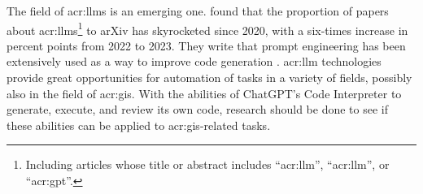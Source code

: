 The field of \glspl{acr:llm} is an emerging one. \cite[2]{fanLargeLanguageModels2023} found that the proportion of papers about \glspl{acr:llm}\footnote{Including articles whose title or abstract includes \enquote{\acrshort{acr:llm}}, \enquote{\acrlong{acr:llm}}, or \enquote{\acrshort{acr:gpt}}.} to arXiv has skyrocketed since 2020, with a six-times increase in percent points from 2022 to 2023. They write that prompt engineering has been extensively used as a way to improve code generation \citep[7]{fanLargeLanguageModels2023}. \acrshort{acr:llm} technologies provide great opportunities for automation of tasks in a variety of fields, possibly also in the field of \acrshort{acr:gis}. With the abilities of ChatGPT's Code Interpreter to generate, execute, and review its own code, research should be done to see if these abilities can be applied to \acrshort{acr:gis}-related tasks.

